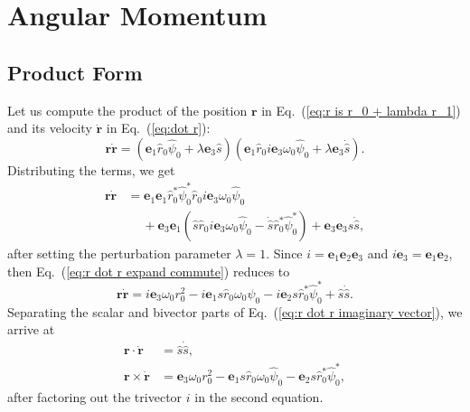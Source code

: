 \documentclass[twocolumn,showpacs,preprintnumbers,amsmath,amssymb]{revtex4}
\begin{document}
\section{Angular Momentum}

\subsection{Product Form}

Let us compute the product of the position $\mathbf r$ in Eq.~(\ref{eq:r is r_0 + lambda r_1}) and its velocity $\dot{\mathbf r}$ in Eq.~(\ref{eq:dot r}):
\begin{equation}
\mathbf r\dot{\mathbf r} = (\mathbf e_1\hat r_0\hat\psi_0 +\lambda\mathbf e_3 \hat s)(\mathbf e_1\hat r_0 i \mathbf e_3 \omega_0\hat\psi_0 +\lambda\mathbf e_3\dot{\hat s}).
\end{equation}
Distributing the terms, we get
\begin{align}
\label{eq:r dot r expand commute}
\mathbf r\dot{\mathbf r} &= \mathbf e_1\mathbf e_1\hat r_0^*\hat\psi_0^*\hat r_0 i \mathbf e_3 \omega_0\hat\psi_0  \nonumber \\
& \quad \ + \mathbf e_3\mathbf e_1 (\hat s\hat r_0 i \mathbf e_3 \omega_0\hat\psi_0 - \dot{\hat s}\hat r_0^*\hat\psi_0^*) + \mathbf e_3\mathbf e_3 s\dot{\hat s},
\end{align}
after setting the perturbation parameter $\lambda = 1$.  Since $i = \mathbf e_1\mathbf e_2\mathbf e_3$ and $ i \mathbf e_3  = \mathbf e_1\mathbf e_2$, then Eq.~(\ref{eq:r dot r expand commute}) reduces to
\begin{equation}
\label{eq:r dot r imaginary vector}
\mathbf r\dot{\mathbf r} = i\mathbf e_3\omega_0r_0^2 - i\mathbf e_1 s\hat r_0\omega_0\hat\psi_0 - i\mathbf e_2 s\hat r_0^*\hat\psi_0^* +\hat s\dot{\hat s} .
\end{equation}
Separating the scalar and bivector parts of Eq.~(\ref{eq:r dot r imaginary vector}), we arrive at
\begin{subequations}
\begin{align}
\mathbf r\cdot\dot{\mathbf r} &= \hat s \dot{\hat s},\\
\label{eq:r x dot r final}
\mathbf r\times\dot{\mathbf r} &= \mathbf e_3\omega_0r_0^2 - \mathbf e_1 s\hat r_0\omega_0\hat\psi_0 - \mathbf e_2 s\hat r_0^*\hat\psi_0^* ,
\end{align}
\end{subequations}
after factoring out the trivector $i$ in the second equation.  
\end{document}
